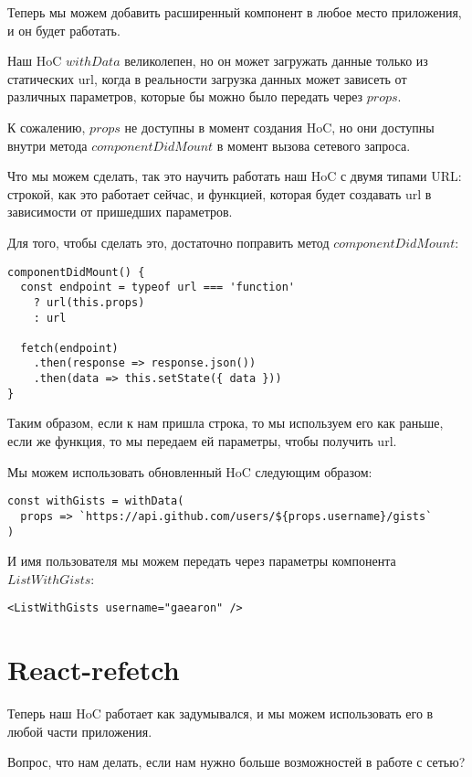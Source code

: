 Теперь мы можем добавить расширенный компонент в любое место приложения, и он будет работать.

Наш HoC $withData$ великолепен, но он может загружать данные только из статических url, когда в реальности загрузка данных может зависеть от различных параметров, которые бы можно было передать через $props$.

К сожалению, $props$ не доступны в момент создания HoC, но они доступны внутри метода $componentDidMount$ в момент вызова сетевого запроса.

Что мы можем сделать, так это научить работать наш HoC с двумя типами URL: строкой, как это работает сейчас, и функцией, которая будет создавать url в зависимости от пришедших параметров.

Для того, чтобы сделать это, достаточно поправить метод $componentDidMount$:

\begin{lstlisting}
componentDidMount() {
  const endpoint = typeof url === 'function'
    ? url(this.props)
    : url
    
  fetch(endpoint)
    .then(response => response.json())
    .then(data => this.setState({ data }))
}
\end{lstlisting}

Таким образом, если к нам пришла строка, то мы используем его как раньше, если же функция, то мы передаем ей параметры, чтобы получить url.

Мы можем использовать обновленный HoC следующим образом:
\begin{lstlisting}
const withGists = withData(
  props => `https://api.github.com/users/${props.username}/gists`
)
\end{lstlisting}

И имя пользователя мы можем передать через параметры компонента $ListWithGists$:

\begin{lstlisting}
<ListWithGists username="gaearon" />
\end{lstlisting}


\section{React-refetch}

Теперь наш HoC работает как задумывался, и мы можем использовать его в любой части приложения.

Вопрос, что нам делать, если нам нужно больше возможностей в работе с сетью?

